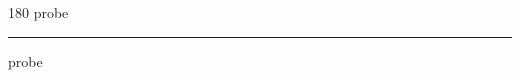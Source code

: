 
\begin{frame}
\begin{center}
\begin{turn}{180}
{\fontsize{2.5cm}{1em}\selectfont probe}
\end{turn}
\vspace{1em}\par  
\hrule
\vspace{1em}\par  
{\fontsize{2.5cm}{1em}\selectfont probe}
\end{center}
\end{frame}
